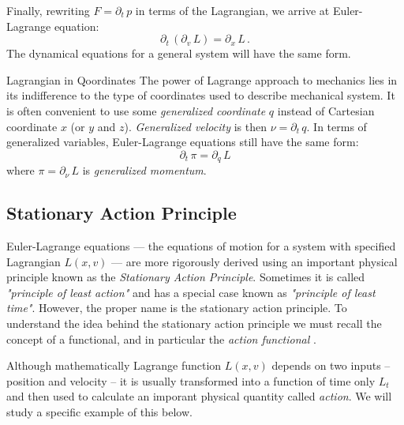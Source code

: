 Finally, rewriting $F=\partial_t\,p$  in terms of the Lagrangian, we arrive at Euler-Lagrange equation:
\[
\partial_t\,\left(\partial_v\,L\right)=\partial_x\,L\,.
\]
The dynamical equations for a general system will have the same form.

\begin{mybio}{Lagrangian in Qoordinates}
	The power of Lagrange approach to mechanics lies in its indifference to the type of coordinates used to describe mechanical system. It is often convenient to use some \emph{generalized coordinate} $q$ instead of Cartesian coordinate $x$ (or $y$ and $z$). \emph{Generalized velocity} is then $\nu=\partial_t\,q$. In terms of generalized variables, Euler-Lagrange equations still have the same form:
	\[
	\partial_t\,\pi = \partial_q\,L
	\]
	where $\pi=\partial_\nu\, L$ is \emph{generalized momentum}.
\end{mybio}

\subsection{Stationary Action Principle}
Euler-Lagrange equations — the equations of motion for a system with specified Lagrangian $L(x,v)$ — are more rigorously derived using an important physical principle known as the \emph{Stationary Action Principle}. Sometimes it is called \emph{"principle of least action"} and has a special case known as \emph{"principle of least time"}. However, the proper name is the stationary action principle.
To understand the idea behind the stationary action principle we must recall the concept of a functional, and in particular the \emph{action functional} .

Although mathematically Lagrange function $L(x,v)$ depends on two inputs --
position and velocity -- it is usually transformed into a function of
time only $L_t$ and then used to calculate an imporant physical
quantity called \emph{action}. We will study a specific example of
this below.

